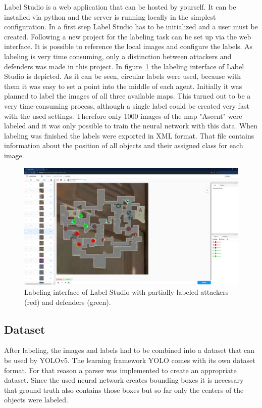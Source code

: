 Label Studio is a web application that can be hosted by yourself. It can be installed via python and 
the server is running locally in the simplest configuration. In a first step Label Studio has to be 
initialized and a user must be created. Following a new project for the labeling task can be set up via 
the web interface. It is possible to reference the local images and configure the labels. As labeling is 
very time consuming, only a distinction between attackers and defenders was made in this project. 
In figure~\ref{fig:app:labelstudio} the labeling interface of Label Studio is depicted. As it can be seen, 
circular labels were used, because with them it was easy to set a point into the middle of each 
agent. Initially it was planned to label the images of all three available maps. This turned out to be a 
very time-consuming process, although a single label could be created very fast with the used 
settings. Therefore only 1000 images of the map "Ascent" were labeled and it was only possible to 
train the neural network with this data. When labeling was finished the labels were exported in XML 
format. That file contains information about the position of all objects and their assigned class for 
each image.

\begin{figure}
	\centering
	\includegraphics[width=0.95\linewidth]{images/07-labelstudio}
	\caption[Interface of Label Studio.]{Labeling interface of Label Studio with partially labeled 
	attackers (red) and defenders (green).}
	\label{fig:app:labelstudio}
\end{figure}

\subsection{Dataset}\label{subsec:app:dataset}

After labeling, the images and labels had to be combined into a dataset that can be used by 
YOLOv5. The learning framework YOLO comes with its own dataset format. For that reason a 
parser was implemented to create an appropriate dataset. Since the used neural network creates 
bounding boxes it is necessary that ground truth also contains those boxes but so far only the 
centers of the objects were labeled. 


